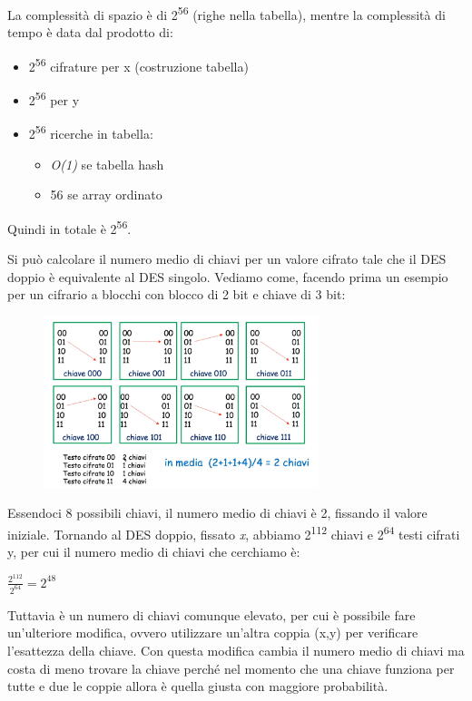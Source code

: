 La complessità di spazio è di 2\textsuperscript{56} (righe nella tabella), mentre la complessità di tempo è data dal prodotto di:
\begin{itemize}
    \item 2\textsuperscript{56} cifrature per x (costruzione tabella)
    \item 2\textsuperscript{56} per y
    \item 2\textsuperscript{56} ricerche in tabella:
        \begin{itemize}
            \item \textit{O(1)} se tabella hash
            \item 56 se array ordinato
        \end{itemize}
\end{itemize}
Quindi in totale è 2\textsuperscript{56}.

Si può calcolare il numero medio di chiavi per un valore cifrato tale che il DES doppio è equivalente al DES singolo. Vediamo come, facendo prima un esempio per un cifrario a blocchi con blocco di 2 bit e chiave di 3 bit: 

\begin{figure}[htb!]
    \centering
    \includegraphics[width=8cm]{./Images/cap1/1.13.png}
\end{figure} 

Essendoci 8 possibili chiavi, il numero medio di chiavi è 2, fissando il valore iniziale. Tornando al DES doppio, fissato \textit{x}, abbiamo 2\textsuperscript{112} chiavi e 2\textsuperscript{64} testi cifrati y, per cui il numero medio di chiavi che cerchiamo è:

\begin{center}
    $\frac{2^{112}}{2^{64}} = 2^{48}$
\end{center}

Tuttavia è un numero di chiavi comunque elevato, per cui è possibile fare un'ulteriore modifica, ovvero utilizzare un'altra coppia (x,y) per verificare l'esattezza della chiave. Con questa modifica cambia il numero medio di chiavi ma costa di meno trovare la chiave perché nel momento che una chiave funziona per tutte e due le coppie allora è quella giusta con maggiore probabilità.

